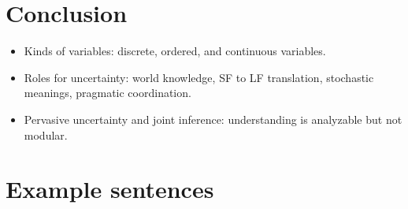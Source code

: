 \documentclass[12pt]{article}
\begin{document}
\section{Conclusion}
\begin{itemize}
\item  Kinds of variables: discrete, ordered, and continuous variables.
\item  Roles for uncertainty: world knowledge, SF to LF translation, stochastic meanings, pragmatic coordination.
\item  Pervasive uncertainty and joint inference: understanding is analyzable but not modular.
\end{itemize}





\section{Example sentences}
\end{document}
